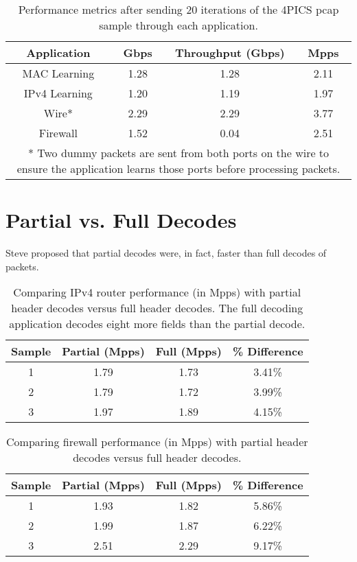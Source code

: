 \begin{table}
\caption{Performance metrics after sending 20 iterations of the 4PICS pcap sample through each application.}
\begin{center}
\begin{tabular}{| c || c | c | c | }
\hline
Application & Gbps & Throughput (Gbps) & Mpps  \\
\hline
MAC Learning & 1.28 & 1.28 & 2.11  \\
\hline
IPv4 Learning & 1.20 & 1.19 & 1.97  \\
\hline 
Wire* & 2.29 & 2.29 & 3.77 \\
\hline
Firewall & 1.52 & 0.04 & 2.51 \\
\hline
\multicolumn{4}{p{\linewidth}}{* Two dummy packets are sent from both ports on the wire to ensure the application learns those ports before processing packets.}
\end{tabular}
\end{center}
\label{tbl:pcap3_stats}
\end{table}

\section{Partial vs. Full Decodes} \label{exp:decode_comparison}

Steve proposed that partial decodes were, in fact, faster than full decodes of packets.

\begin{table}
\caption{Comparing IPv4 router performance (in Mpps) with partial header decodes versus full header decodes. The full decoding application decodes eight more fields than the partial decode.}
\begin{center}
\begin{tabular}{| c || c | c | c |}
\hline
Sample & Partial (Mpps) & Full (Mpps) & \% Difference \\
\hline
1 & 1.79 & 1.73 & 3.41\% \\
\hline
2 & 1.79 & 1.72 & 3.99\% \\
\hline
3 & 1.97 & 1.89 & 4.15\% \\ 
\hline
\end{tabular}
\end{center}
\label{tbl:router_cmp}
\end{table}

\begin{table}
\caption{Comparing firewall performance (in Mpps) with partial header decodes versus full header decodes.}
\begin{center}
\begin{tabular}{| c || c | c | c |}
\hline
Sample & Partial (Mpps) & Full (Mpps) & \% Difference \\
\hline
1 & 1.93 & 1.82 & 5.86\% \\
\hline
2 & 1.99 & 1.87 & 6.22\% \\
\hline
3 & 2.51 & 2.29 & 9.17\% \\ 
\hline
\end{tabular}
\end{center}
\label{tbl:router_cmp}
\end{table}


